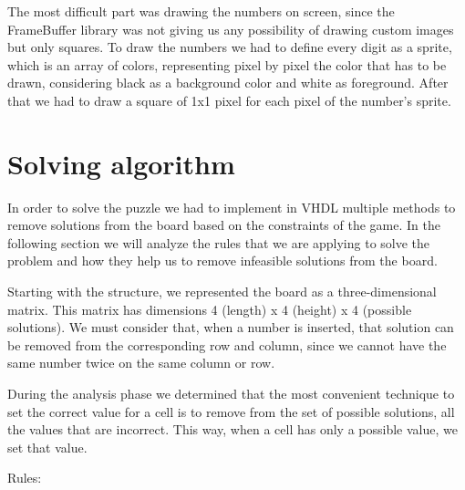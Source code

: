 \documentclass[12pt]{report}
\begin{document}
The most difficult part was drawing the numbers on screen, since the
FrameBuffer library was not giving us any possibility of drawing custom
images but only squares. To draw the numbers we had to define every digit
as a sprite, which is an array of colors, representing pixel by pixel the
color that has to be drawn, considering black as a background color and
white as foreground. After that we had to draw a square of 1x1 pixel for
each pixel of the number's sprite.

\chapter*{Solving algorithm}

In order to solve the puzzle we had to implement in VHDL multiple methods
to remove solutions from the board based on the constraints of the game. In
the following section we will analyze the rules that we are applying to
solve the problem and how they help us to remove infeasible solutions from
the board.

Starting with the structure, we represented the board as
a three-dimensional matrix. This matrix has dimensions 4 (length)
x 4 (height) x 4 (possible solutions). We must consider that, when
a number is inserted, that solution can be removed from the corresponding
row and column, since we cannot have the same number twice on the same
column or row.

During the analysis phase we determined that the most convenient technique
to set the correct value for a cell is to remove from the set of possible
solutions, all the values that are incorrect. This way, when a cell has
only a possible value, we set that value.

Rules:
\end{document}
